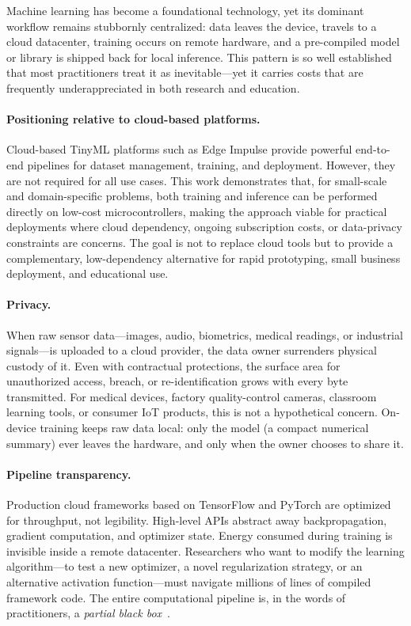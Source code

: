 \documentclass[12pt]{article}
\begin{document}
Machine learning has become a foundational technology, yet its dominant workflow
remains stubbornly centralized: data leaves the device, travels to a cloud
datacenter, training occurs on remote hardware, and a pre-compiled model or library
is shipped back for local inference.
This pattern is so well established that most practitioners treat it as
inevitable---yet it carries costs that are frequently underappreciated in both
research and education.

\paragraph{Positioning relative to cloud-based platforms.}
Cloud-based TinyML platforms such as Edge Impulse provide powerful end-to-end
pipelines for dataset management, training, and deployment.
However, they are not required for all use cases.
This work demonstrates that, for small-scale and domain-specific problems, both
training and inference can be performed directly on low-cost microcontrollers,
making the approach viable for practical deployments where cloud
dependency, ongoing subscription costs, or data-privacy constraints are concerns.
The goal is not to replace cloud tools but to provide a complementary,
low-dependency alternative for rapid prototyping, small business deployment,
and educational use.

\paragraph{Privacy.}
When raw sensor data---images, audio, biometrics, medical readings, or industrial
signals---is uploaded to a cloud provider, the data owner surrenders physical
custody of it.
Even with contractual protections, the surface area for unauthorized access,
breach, or re-identification grows with every byte transmitted.
For medical devices, factory quality-control cameras, classroom learning tools, or
consumer IoT products, this is not a hypothetical concern.
On-device training keeps raw data local: only the model (a compact numerical
summary) ever leaves the hardware, and only when the owner chooses to share it.

\paragraph{Pipeline transparency.}
Production cloud frameworks based on TensorFlow and PyTorch are optimized for
throughput, not legibility.
High-level APIs abstract away backpropagation, gradient computation, and optimizer
state.
Energy consumed during training is invisible inside a remote datacenter.
Researchers who want to modify the learning algorithm---to test a new optimizer,
a novel regularization strategy, or an alternative activation function---must
navigate millions of lines of compiled framework code.
The entire computational pipeline is, in the words of practitioners, a
\emph{partial black box}~\cite{reddi2024mlsysbook}.
\end{document}
